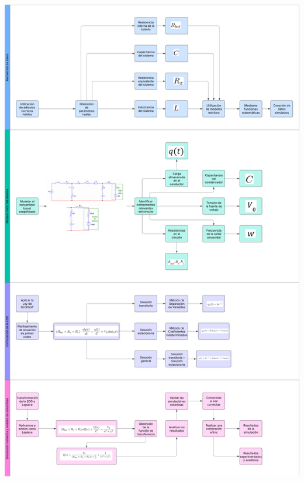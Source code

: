 \documentclass[12pt]{article}
\begin{document}
\begin{tcbposter}
{\begin{multicols}{2}
            \vspace{1mm}
            \includegraphics[width=\linewidth, height=1000pt]{img/diagrama.png}

\end{multicols}}
\end{tcbposter}
\end{document}
